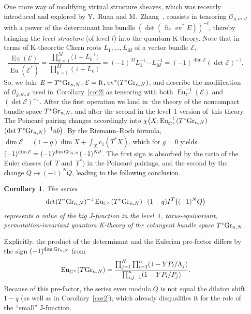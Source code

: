 \documentclass[pdftex]{sigma}
\numberwithin{equation}{section}
\newtheorem{Corollary}[Theorem]{Corollary}
\def\E{\mathcal E}
\def\O{\mathcal O}
\def\CC{\mathbb C}
\def\det{\operatorname{det}}
\def\ev{\operatorname{ev}}
\def\ft{\operatorname{ft}}
\def\Eu{\operatorname{Eu}}
\begin{document}
One more way of modifying virtual structure sheaves, which was recently introduced and explored by Y.~Ruan and M.~Zhang~\cite{R-Z}, consists in tensoring $\O_{g,m,d}$ with a power of the determinant line bundle $(\det (\ft_*\ev^*E))^{-l}$, thereby bringing the {\em level structure} (of level $l$) into the quantum K-theory. Note that in terms of K-theoretic Chern roots $L_1,\dots, L_M$ of a vector bundle $\E$,
\[
\frac{\Eu (\E)}{\Eu (\E^*)}=\frac{\prod_{k=1}^M \big(1-L_k^{-1}\big)}{\prod_{k=1}^M(1-L_k)}
=(-1)^M L_1^{-1}\cdots L_M^{-1} =(-1)^{\dim \E} (\det \E)^{-1}.
\]
So, we take $E=T^*{\rm Gr}_{n,N}$, $\E=\ft_*\ev^*(T^*{\rm Gr}_{n,N})$, and describe the modification of $\O_{g,m,d}$ used in~Corollary~\ref{cor2} as tensoring with both $\Eu^{-1}_{\CC^{\times}}(\E)$ and $(\det \E)^{-1}$.
After the first operation we land in~the theory of the noncompact bundle space $T^*{\rm Gr}_{n,N}$, and after the second in the level~$1$ version of~this theory. The Poincar\'e pairing changes accordingly into $\chi \big(X; \Eu^{-1}_{\CC^{\times}}(T^*{\rm Gr}_{n,N})$ $(\det T^*{\rm Gr}_{n,N})^{-1} ab\big)$. By the Riemann--Roch formula, $\dim \E = (1-g)\dim X+\int_X c_1(T^*X)$, which for $g=0$ yields $(-1)^{\dim \E}=(-1)^{\dim {\rm Gr}_{n,N}}(-1)^{Nd}$. The first sign is absorbed by the ratio of the Euler classes (of~$T$ and~$T^*$) in the Poincar\'e pairings, and the second by the change $Q\mapsto (-1)^N Q$, leading to the following conclusion.

\begin{Corollary}\label{cor3}
The series
\[
\det (T^*{\rm Gr}_{n,N})^{-1}\Eu_{\CC^{\times}}(T^*{\rm Gr}_{n,N})\cdot (1-q) I^T\big((-1)^N Q\big)
\]
represents a value of the big J-function in the level~$1$, torus-equivariant, permutation-invariant quantum K-theory of the cotangent bundle space $T^*{\rm Gr}_{n,N}$.
\end{Corollary}

Explicitly, the product of the determinant and the Eulerian pre-factor differs by the sign $(-1)^{\dim {\rm Gr}_{n,N}}$ from
\[
\Eu_{\CC^{\times}}(T{\rm Gr}_{n,N})=\frac{\prod_{j=1}^N\prod_{i=1}^n(1-YP_i/\Lambda_j)}{\prod_{i,j=1}^n(1-Y P_i/P_j)}.
\]
Because of this pre-factor, the series even modulo $Q$ is not equal the dilaton shift $1-q$ (as well as in Corollary~\ref{cor2}), which already disqualifies it for the role of the ``small'' J-function.
\end{document}
